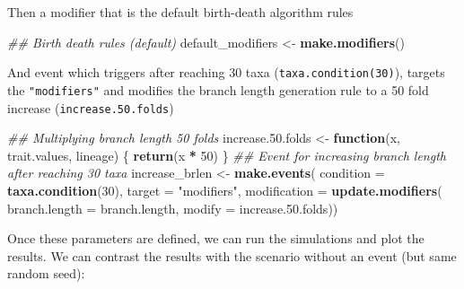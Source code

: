 \documentclass[
]{book}
\newenvironment{Shaded}{\begin{snugshade}}{\end{snugshade}}
\newcommand{\CommentTok}[1]{\textcolor[rgb]{0.56,0.35,0.01}{\textit{#1}}}
\newcommand{\ControlFlowTok}[1]{\textcolor[rgb]{0.13,0.29,0.53}{\textbf{#1}}}
\newcommand{\DataTypeTok}[1]{\textcolor[rgb]{0.13,0.29,0.53}{#1}}
\newcommand{\DecValTok}[1]{\textcolor[rgb]{0.00,0.00,0.81}{#1}}
\newcommand{\FloatTok}[1]{\textcolor[rgb]{0.00,0.00,0.81}{#1}}
\newcommand{\KeywordTok}[1]{\textcolor[rgb]{0.13,0.29,0.53}{\textbf{#1}}}
\newcommand{\NormalTok}[1]{#1}
\newcommand{\OperatorTok}[1]{\textcolor[rgb]{0.81,0.36,0.00}{\textbf{#1}}}
\newcommand{\StringTok}[1]{\textcolor[rgb]{0.31,0.60,0.02}{#1}}
\begin{document}
Then a modifier that is the default birth-death algorithm rules

\begin{Shaded}
\begin{Highlighting}[]
\CommentTok{\#\# Birth death rules (default)}
\NormalTok{default\_modifiers \textless{}{-}}\StringTok{ }\KeywordTok{make.modifiers}\NormalTok{()}
\end{Highlighting}
\end{Shaded}

And event which triggers after reaching 30 taxa (\texttt{taxa.condition(30)}), targets the \texttt{"modifiers"} and modifies the branch length generation rule to a 50 fold increase (\texttt{increase.50.folds})

\begin{Shaded}
\begin{Highlighting}[]
\CommentTok{\#\# Multiplying branch length 50 folds}
\NormalTok{increase.}\FloatTok{50.}\NormalTok{folds \textless{}{-}}\StringTok{ }\ControlFlowTok{function}\NormalTok{(x, trait.values, lineage) \{}
  \KeywordTok{return}\NormalTok{(x }\OperatorTok{*}\StringTok{ }\DecValTok{50}\NormalTok{)}
\NormalTok{\}}
\CommentTok{\#\# Event for increasing branch length after reaching 30 taxa}
\NormalTok{increase\_brlen \textless{}{-}}\StringTok{ }\KeywordTok{make.events}\NormalTok{(}
                  \DataTypeTok{condition    =} \KeywordTok{taxa.condition}\NormalTok{(}\DecValTok{30}\NormalTok{),}
                  \DataTypeTok{target       =} \StringTok{"modifiers"}\NormalTok{,}
                  \DataTypeTok{modification =} \KeywordTok{update.modifiers}\NormalTok{(}
                                    \DataTypeTok{branch.length =}\NormalTok{ branch.length,}
                                    \DataTypeTok{modify        =}\NormalTok{ increase.}\FloatTok{50.}\NormalTok{folds))}
\end{Highlighting}
\end{Shaded}

Once these parameters are defined, we can run the simulations and plot the results.
We can contrast the results with the scenario without an event (but same random seed):
\end{document}
